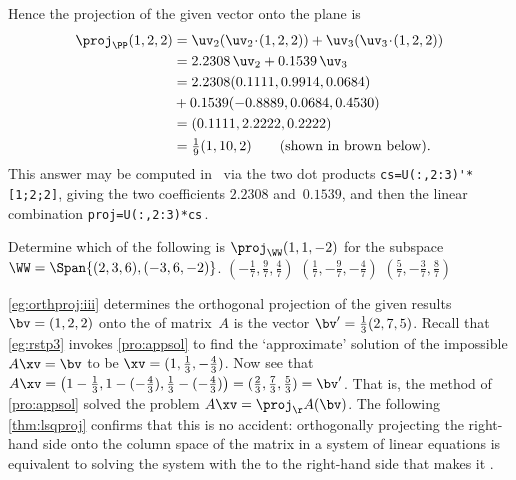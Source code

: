 \begin{example}
\begin{enumerate}[ref=\ref{eg:orthproj}(\alph*)]
\begin{solution}
\begin{center}\end{center}
Hence the projection of the given vector onto the plane is
\begin{align*}
\proj_\PP(1,2,2)
&=\uv_2(\uv_2\cdot(1,2,2))+\uv_3(\uv_3\cdot(1,2,2))
\\&=2.2308\,\uv_2+0.1539\,\uv_3
\\&=2.2308(0.1111,0.9914,0.0684)
\\&{}+0.1539(-0.8889,0.0684,0.4530)
\\&=(0.1111,2.2222,0.2222)
\\&=\tfrac19(1,10,2)
\qquad(\text{shown in brown below}).
\end{align*}
This answer may be computed in \script\ via the two dot products \verb|cs=U(:,2:3)'*[1;2;2]|, giving the two coefficients \(2.2308\) and~\(0.1539\), and then the linear combination \verb|proj=U(:,2:3)*cs|\,.
\begin{center}\end{center}
\end{solution}
\end{enumerate}
\end{example}



\begin{activity}
Determine which of the following is \(\proj_\WW(1,1,-2)\) for the subspace \(\WW=\Span\{(2,3,6), (-3,6,-2)\}\).
{\((-\frac17,\frac97,\frac47)\)}
{\((\frac17,-\frac97,-\frac47)\)}
{\((\frac57,-\frac37,\frac87)\)}
\end{activity}




\autoref{eg:orthproj:iii} determines the orthogonal projection of the given  results \(\bv=(1,2,2)\) onto the  of matrix~\(A\) is the vector \(\bv'=\tfrac13(2,7,5)\).
Recall that \autoref{eg:rstp3} invokes \autoref{pro:appsol} to find the `approximate' solution of the impossible \(A\xv=\bv\) to be \(\xv=(1,\frac13,-\frac43)\).
Now see that \(A\xv
=\big(1-\frac13,1-(-\frac43),\frac13-(-\frac43)\big)
=(\frac23,\frac73,\frac53)
=\bv'\).
That is, the  method of \autoref{pro:appsol} solved the problem \(A\xv=\proj_\AA(\bv)\).
The following \cref{thm:lsqproj} confirms that this is no accident: orthogonally projecting the right-hand side onto the column space of the matrix in a system of linear equations is equivalent to solving the system with the  to the right-hand side that makes it .


